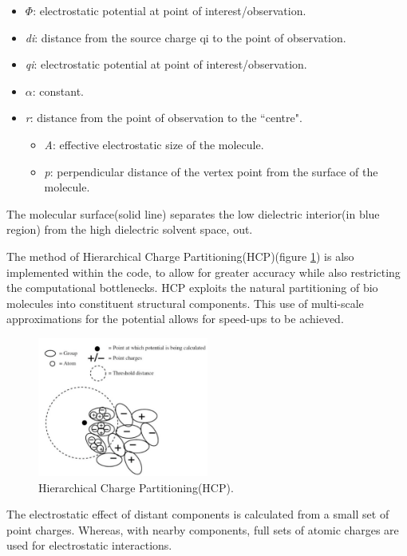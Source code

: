 \begin{itemize}
    \item $\Phi$: electrostatic potential at point of interest/observation.
    \item \emph{di}: distance from the source charge qi to the point of observation.
    \item \emph{qi}: electrostatic potential at point of interest/observation.
    \item $\alpha$: constant.
    \item  \emph{r}: distance from the point of observation to the ``centre".
    \begin{itemize}
        \item \emph{A}: effective electrostatic size of the molecule.
        \item \emph{p}: perpendicular distance of the vertex point from the surface of the molecule.
    \end{itemize}
\end{itemize}

\par{The molecular surface(solid line) separates the low dielectric interior(\in in blue region) 
    from the high dielectric solvent space, \in out.}

\par{The method of Hierarchical Charge Partitioning(HCP)(figure \ref{hpc}) is also implemented within the code, 
    to allow for greater accuracy while also restricting the computational bottlenecks. 
    HCP exploits the natural partitioning of bio molecules into constituent structural components. 
    This use of multi-scale approximations for the potential allows for speed-ups to be achieved.}

\begin{figure}[!h]
    \centering
    \includegraphics[width=0.5\textwidth]{figures/hpc.png}
    \caption{Hierarchical Charge Partitioning(HCP)\cite{nbody_gpu}.}
    \label{hpc}
\end{figure}

\par{The electrostatic effect of distant components is calculated from a small set of point charges. 
    Whereas, with nearby components, full sets of atomic charges are used for electrostatic interactions.}





